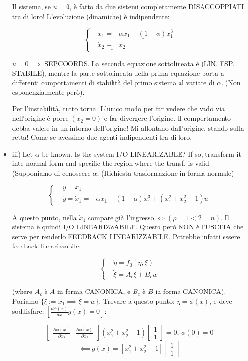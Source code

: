 \begin{itemize}
Il sistema, se $u=0$, è fatto da due sistemi completamente DISACCOPPIATI tra di loro! L'evoluzione (dinamiche) è indipendente:

\[
	\left\{
	\begin{aligned}
	&\dot{x}_1 = \underline{-\alpha x_1 - (1-\alpha)x_1^3}\\
	&\underline{\dot{x}_2 = -x_2}
	\end{aligned}
	\right.
\]

$u=0 \implies$ SEPCOORDS. La seconda equazione sottolineata è (LIN. ESP. STABILE), mentre la parte sottolineata della prima equazione porta a differenti comportamenti di stabilità del primo sistema al variare di $\alpha$. (Non esponenzialmente però).

Per l'instabilità, tutto torna. L'unico modo per far vedere che vado via nell'origine è porre $(x_2=0)$ e far divergere l'origine. Il comportamento debba valere in un intorno dell'origine! Mi allontano dall'origine, stando sulla retta! Come se avessimo due agenti indipendenti tra di loro.

\item{iii)} Let $\alpha$ be known. Is the system I/O LINEARIZABLE? If so, transform it into normal form and specific the region where the transf. is valid (Supponiamo di conoscere $\alpha$; (Richiesta trasformazione in forma normale)

\[
	\left\{
	\begin{aligned}
	&y = x_1\\
	&\dot{y} = \dot{x}_1 = -\alpha x_1 -(1-\alpha)x_1^3 + (x_1^2+x_2^2-1)u
	\end{aligned}
	\right.
\]

A questo punto, nella $\dot{x}_1$ compare già l'ingresso $\iff (\rho=1<2=n)$. Il sistema è quindi I/O LINEARIZZABILE. Questo però NON è l'USCITA che serve per renderlo FEEDBACK LINEARIZZABILE. Potrebbe infatti essere feedback linearizzabile:

\[
	\left\{
	\begin{aligned}
	&\dot{\eta} = f_0(\eta,\xi)\\
	&\dot{\xi} = A_c\xi + B_cw
	\end{aligned}
	\right.
\]

(where $A_c$ è $A$ in forma CANONICA, e $B_c$ è $B$ in forma CANONICA).
Poniamo $\{\xi := x_1 \implies \dot{\xi} = w\}$. Trovare a questo punto: $\eta = \phi(x)$, e deve soddisfare: $[\frac{d\phi(x)}{dx}g(x) = 0]$:

\[
	\begin{bmatrix}\frac{\partial{\phi(x)}}{\partial{x_1}}&\frac{\partial{\phi(x)}}{\partial{x_2}}\end{bmatrix}(x_1^2+x_2^2-1)\begin{bmatrix}1\\1\end{bmatrix} = 0,\ \phi(0)=0
\]
\[
	\impliedby g(x) = [x_1^2+x_2^2-1]\begin{bmatrix}1\\1\end{bmatrix}
\]


\end{itemize}
